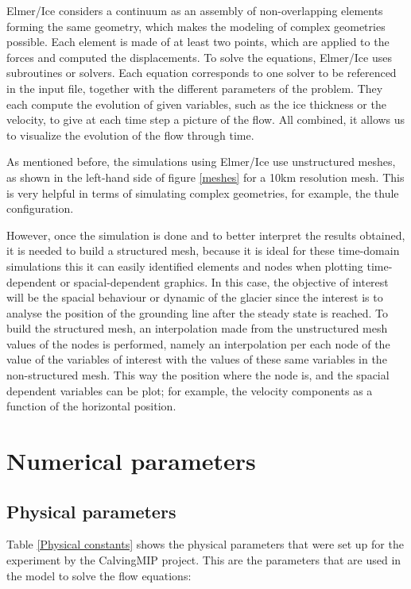 \documentclass{article}
\begin{document}
Elmer/Ice considers a continuum as an assembly of non-overlapping elements forming the same geometry, which makes the modeling of complex geometries possible. Each element is made of at least two points, which are applied to the forces and computed the displacements. To solve the equations, Elmer/Ice uses subroutines or solvers. Each equation corresponds to one solver to be referenced in the input file, together with the different parameters of the problem. They each compute the evolution of given variables, such as the ice thickness or the velocity, to give at each time step a picture of the flow. All combined, it allows us to visualize the evolution of the flow through time.

As mentioned before, the simulations using Elmer/Ice use unstructured meshes, as shown in the left-hand side of figure \ref{meshes} for a 10km resolution mesh. This is very helpful in terms of simulating complex geometries, for example, the thule configuration.


However, once the simulation is done and to better interpret the results obtained, it is needed to build a structured mesh, because it is ideal for these time-domain simulations this it can  easily identified elements and nodes when plotting time-dependent or spacial-dependent graphics. In this case, the objective of interest will be the spacial behaviour or dynamic of the glacier since the interest is to analyse the position of the grounding line after the steady state is reached. To build the structured mesh, an interpolation made from the unstructured mesh values of the nodes is performed, namely an interpolation per each node of the value of the variables of interest with the values of these same variables in the non-structured mesh. This way the position where the node is, and the spacial dependent variables can be plot; for example, the velocity components as a function of the horizontal position. 

\section{Numerical parameters}
\label{Numerical_parameters}
\subsection{Physical parameters}
Table \ref{Physical constants} shows the physical parameters that were set up for the experiment by the CalvingMIP project. This are the parameters that are used in the model to solve the flow equations:
\end{document}
